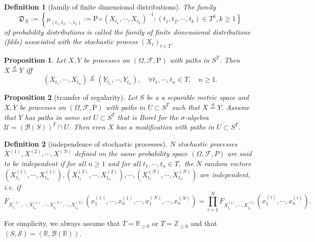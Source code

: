 \documentclass{report}
\newtheorem{definition}{Definition}[section]
\newtheorem{proposition}{Proposition}[section]
\theoremstyle{nonumberplain}
\begin{document}
\begin{definition}[family of finite dimensional distributions]
	The family 
	$$\mathfrak{D}_X:=\left\{\mu_{(t_{1}, t_{2}, \cdots, t_{k})}:= \mathrm{P}\circ\left(X_{t_{1}}, \cdots, X_{t_{k}}\right)^{-1}:\right.\left.\left(t_{1}, t_{2}, \cdots, t_{k}\right) \in T^k,k\ge1\right\}$$ of probability distributions is called	the \emph{family of finite dimensional distributions (fdds) associated with the stochastic process $(X_{t})_{t\in T}$}.
\end{definition}

\begin{proposition}
	Let $X,Y$ be processes on $(\Omega ,{\mathcal{F}},\mathrm{P})$ with paths in $S^T$. Then $X \stackrel{d}{=} Y$ iff
	\[
	\left(X_{t_{1}}, \cdots, X_{t_{n}}\right) \stackrel{d}{=}\left(Y_{t_{1}}, \cdots, Y_{t_{n}}\right), \quad \forall t_{1}, \cdots, t_{n} \in T,\quad n\ge 1.
	\]
\end{proposition}



\begin{proposition}[transfer of regularity]
		Let $S$ be a a separable metric space and $X, Y$ be processes on $(\Omega ,{\mathcal{F}},\mathrm{P})$ with paths in $U \subset S^T$ such that $X \stackrel{d}{=} Y$. Assume that $Y$ has paths in some set $U \subset S^{T}$ that is Borel for the $\sigma$-algebra $\mathcal{U}=(\mathcal{B}(S))^{T}\cap U$. Then even $X$ has a modification with paths in $U \subset S^{T}$.
\end{proposition}

\begin{definition}[independence of stochastic processes]
	$N$ stochastic processes $X^{(1)},X^{(2)},\cdots,X^{(N)}$ defined on the same probability space $(\Omega, \mathcal{F}, P)$ are said to be independent if for all $n\ge1$ and for all $t_{1}, \cdots, t_{n} \in T,$ the $N$ random vectors $\left(X^{(1)}_{t_{1}}, \cdots, X^{(1)}_{t_{n}}\right), \left(X^{(2)}_{t_{1}}, \cdots, X^{(2)}_{t_{n}}\right),\cdots,\left(X^{(N)}_{t_{1}}, \cdots, X^{(N)}_{t_{n}}\right)$ are independent, i.e. if
	\[
	F_{X^{(1)}_{t_{1}}, \cdots, X^{(1)}_{t_{n}}, \cdots, X^{(N)}_{t_{1}}, \cdots, X^{(N)}_{t_{n}}}\left(x^{(1)}_{1}, \cdots, x^{(1)}_{n}, \cdots, x^{(N)}_{1}, \cdots, x^{(N)}_{n}\right)=\prod_{i=1}^N F_{X^{(i)}_{t_1}, \cdots, X^{(i)}_{t_{n}}}\left(x^{(i)}_{1}, \cdots, x^{(i)}_{n}\right) .
	\]
\end{definition}

For simplicity, we always assume that $T=\mathbb{R}_{\ge 0}$ or $T=\mathbb{Z}_{\ge 0}$ and that $(S,\mathcal{S})=(\mathbb{R},\mathcal{B}(\mathbb{R}))$.
\end{document}
